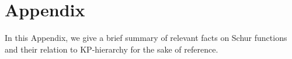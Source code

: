 %
%
%
\par\newpage
\FigOka
\ExOka
\par\newpage
\FigHer
\ExHer
\par\newpage
\def\thesection{A}
\section{Appendix}
%
In this Appendix, we give a brief summary of relevant facts 
on Schur functions and their
relation to KP-hierarchy for the sake of reference. 
%
